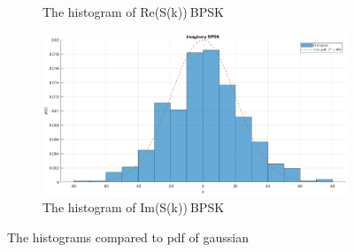 \begin{figure}[ht]
\begin{subfigure}{.5\textwidth}
        \caption{The histogram of Re(S(k))$~$BPSK}
        \label{fig:re_bpsk}
    \end{subfigure}
    \begin{subfigure}{.5\textwidth}
        \centering
        \includegraphics[width=.8\linewidth]{figures/im_bpsk.eps}
        \caption{The histogram of Im(S(k))$~$BPSK}
        \label{fig:im_bpsk}
    \end{subfigure}
    \caption{The histograms compared to pdf of gaussian}
    \label{fig:gauss}
\end{figure}

